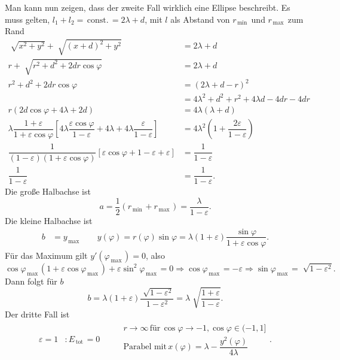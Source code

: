 \documentclass[a4paper,12pt]{article}
\numberwithin{equation}{section}
\begin{document}
Man kann nun zeigen, dass der zweite Fall wirklich eine Ellipse beschreibt. Es muss gelten, $l_1+l_2=\,\text{const.}\,=2\lambda +d$, mit $l$ als Abstand von $r_{\,\text{min}\,}$ und $r_{\,\text{max}\,}$ zum Rand
\begin{align*}
        \sqrt[]{x^2+y^2}+\sqrt[]{\left(x+d\right)^2+y^2}&=2\lambda +d\\
        r+\sqrt[]{r^2+d^2+2dr\cos \varphi }&=2\lambda +d\\
        r^2+d^2+2dr\cos \varphi &=\left(2\lambda +d-r\right)^2\\
                                &=4\lambda ^2+d^2+r^2+4\lambda d-4dr-4dr\\
        r\left(2d\cos \varphi +4\lambda +2d\right)&=4\lambda \left(\lambda +d\right)\\
        \lambda \dfrac{1+\varepsilon }{1+\varepsilon \cos \varphi }\left[4\lambda \dfrac{\varepsilon \cos \varphi }{1-\varepsilon }+4\lambda +4\lambda \dfrac{\varepsilon }{1-\varepsilon }\right]&=4\lambda ^2\left(1+\dfrac{2\varepsilon }{1-\varepsilon }\right)\\
        \dfrac{1}{\left(1-\varepsilon \right)\left(1+\varepsilon \cos \varphi \right)}\left[\varepsilon \cos \varphi +1-\varepsilon +\varepsilon \right]&=\dfrac{1}{1-\varepsilon }\\
        \dfrac{1}{1-\varepsilon }&=\dfrac{1}{1-\varepsilon }
.\end{align*}
Die große Halbachse ist
\[ 
        a=\dfrac{1}{2}\left(r_{\,\text{min}\,}+r_{\,\text{max}\,}\right)=\dfrac{\lambda }{1-\varepsilon }
.\] 
Die kleine Halbachse ist
\begin{align*}
        b&=y_{\,\text{max}\,}\qquad y\left(\varphi \right)=r\left(\varphi \right)\sin \varphi =\lambda \left(1+\varepsilon \right)\dfrac{\sin \varphi }{1+\varepsilon \cos \varphi }
.\end{align*}
Für das Maximum gilt $y'\left(\varphi _{\,\text{max}\,}\right)=0$, also
\[ 
        \cos \varphi _{\,\text{max}\,}\left(1+\varepsilon \cos \varphi _{\,\text{max}\,}\right)+\varepsilon \sin ^2\varphi _{\,\text{max}\,}=0\Rightarrow \cos \varphi _{\,\text{max}\,}=-\varepsilon \Rightarrow \sin \varphi _{\,\text{max}\,}=\sqrt[]{1-\varepsilon ^2}
.\] 
Dann folgt für $b$ 
\[ 
        b=\lambda \left(1+\varepsilon \right)\dfrac{\sqrt[]{1-\varepsilon ^2}}{1-\varepsilon ^2}=\lambda \sqrt[]{\dfrac{1+\varepsilon }{1-\varepsilon }}
.\] 
Der dritte Fall ist
\begin{align*}
                \varepsilon =1&:E_{\,\text{tot}\,}=0&&\begin{aligned}
                &r\rightarrow \infty\,\text{für}\,\cos \varphi \rightarrow -1,\cos \varphi  \in (-1,1]\\
                &\text{Parabel mit}\,x\left(\varphi \right)=\lambda -\dfrac{y^2\left(\varphi \right)}{4\lambda }
                \end{aligned}
.\end{align*}
\end{document}
